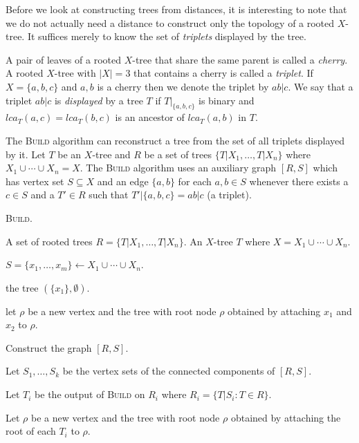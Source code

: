 Before we look at constructing trees from distances, it is interesting to note
that we do not actually need a distance to construct only the topology of a
rooted $X$-tree.  It suffices merely to know the set of \textit{triplets}
displayed by the tree.

A pair of leaves of a rooted $X$-tree that share the same parent is called a
\textit{cherry}.  A rooted $X$-tree with $|X| = 3$ that contains a cherry is
called a \textit{triplet}.  If $X = \{a,b,c\}$ and $a,b$ is a cherry then we
denote the triplet by $ab|c$.  We say that a triplet $ab|c$ is
\textit{displayed} by a tree $T$ if $T|_{\{a,b,c\}}$ is binary and $lca_T(a,c) =
lca_T(b,c)$ is an ancestor of $lca_T(a,b)$ in $T$.

The \textsc{Build} algorithm can reconstruct a tree from the set of all
triplets displayed by it.  Let $T$ be an $X$-tree and $R$ be a set of trees
$\{T|X_1,\dotsc,T|X_n\}$ where $X_1 \cup \dotsb \cup X_n = X$.  The
\textsc{Build} algorithm uses an auxiliary graph $[R,S]$ which has vertex set
$S \subseteq X$ and an edge $\{a,b\}$ for each $a,b \in S$ whenever there exists a $c \in
S$ and a $T' \in R$ such that $T'|\{a,b,c\} = ab|c$ (a triplet).

\begin{algorithm}[h]
  \caption{\textsc{Build}.}
  \label{alg:build}

  \begin{algorithmic}
    \Require A set of rooted trees $R = \{T|X_1,\dotsc,T|X_n\}$.
    \Ensure  An $X$-tree $T$ where $X = X_1 \cup \dotsb \cup X_n$.

    \State $S = \{x_1,\dotsc,x_m\} \gets X_1 \cup \dotsb \cup X_n$.

     \Return the tree $(\{x_1\},\emptyset)$. \EndIf

     let $\rho$ be a new vertex and \Return the tree with root
    node $\rho$ obtained by attaching $x_1$ and $x_2$ to $\rho$. \EndIf

    \State Construct the graph $[R,S]$.

    \State Let $S_1,\dotsc,S_k$ be the vertex sets of the connected components
    of $[R,S]$.

    \State Let $T_i$ be the output of \textsc{Build} on $R_i$ where $R_i =
    \{T|S_i \colon T \in R\}$.
    \EndFor

    \State Let $\rho$ be a new vertex and \Return the tree with root node
    $\rho$ obtained by attaching the root of each $T_i$ to $\rho$.
    
  \end{algorithmic}
\end{algorithm}

